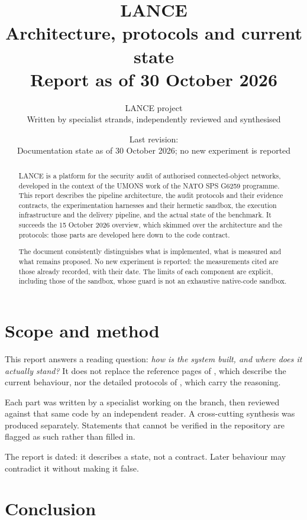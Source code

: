 \documentclass[11pt,a4paper]{article}
\title{LANCE\\[4pt]
\large Architecture, protocols and current state\\[2pt]
\normalsize Report as of 30 October 2026}
\author{LANCE project\\\small Written by specialist strands, independently reviewed and synthesised}
\date{Last revision: \revision\\[3pt]
\small Documentation state as of 30 October 2026; no new experiment is reported}
\DeclareRobustCommand{\code}[1]{{\small\path{#1}}}
\begin{document}
\maketitle

\begin{abstract}
LANCE is a platform for the security audit of authorised connected-object
networks, developed in the context of the UMONS work of the NATO SPS G6259
programme. This report describes the pipeline architecture, the audit protocols
and their evidence contracts, the experimentation harnesses and their hermetic
sandbox, the execution infrastructure and the delivery pipeline, and the actual
state of the benchmark. It succeeds the 15 October 2026 overview, which skimmed
over the architecture and the protocols: those parts are developed here down to
the code contract.

The document consistently distinguishes what is implemented, what is measured and
what remains proposed. No new experiment is reported: the measurements cited are
those already recorded, with their date. The limits of each component are
explicit, including those of the sandbox, whose guard is not an exhaustive
native-code sandbox.
\end{abstract}

\tableofcontents
\clearpage



\section{Scope and method}
\label{sec:scope}

This report answers a reading question: \emph{how is the system built, and where
does it actually stand?} It does not replace the reference pages of \code{docs/},
which describe the current behaviour, nor the detailed protocols of
\code{research/}, which carry the reasoning.

Each part was written by a specialist working on the \code{dev/1} branch, then
reviewed against that same code by an independent reader. A cross-cutting
synthesis was produced separately. Statements that cannot be verified in the
repository are flagged as such rather than filled in.

The report is dated: it describes a state, not a contract. Later behaviour may
contradict it without making it false.







\section{Conclusion}


\end{document}
